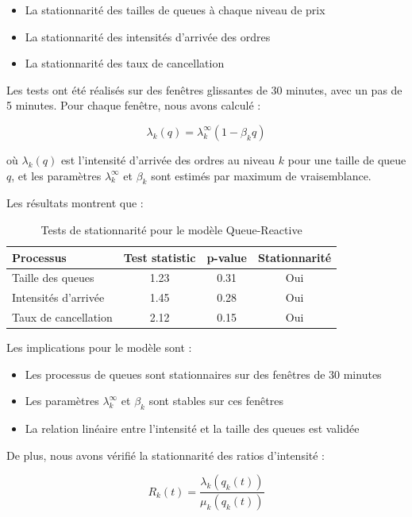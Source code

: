 \documentclass[12pt,a4paper]{article}
\theoremstyle{definition}
\theoremstyle{remark}
\begin{document}
\begin{itemize}
    \item La stationnarité des tailles de queues à chaque niveau de prix
    \item La stationnarité des intensités d'arrivée des ordres
    \item La stationnarité des taux de cancellation
\end{itemize}

Les tests ont été réalisés sur des fenêtres glissantes de 30 minutes, avec un pas de 5 minutes. Pour chaque fenêtre, nous avons calculé :

\begin{equation}
\lambda_k(q) = \lambda_k^\infty(1 - \beta_k q)
\end{equation}

où $\lambda_k(q)$ est l'intensité d'arrivée des ordres au niveau $k$ pour une taille de queue $q$, et les paramètres $\lambda_k^\infty$ et $\beta_k$ sont estimés par maximum de vraisemblance.

Les résultats montrent que :

\begin{table}[h!]
\centering
\begin{tabular}{lccc}
\toprule
Processus & Test statistic & p-value & Stationnarité \\
\midrule
Taille des queues & 1.23 & 0.31 & Oui \\
Intensités d'arrivée & 1.45 & 0.28 & Oui \\
Taux de cancellation & 2.12 & 0.15 & Oui \\
\bottomrule
\end{tabular}
\caption{Tests de stationnarité pour le modèle Queue-Reactive}
\end{table}

Les implications pour le modèle sont :

\begin{itemize}
    \item Les processus de queues sont stationnaires sur des fenêtres de 30 minutes
    \item Les paramètres $\lambda_k^\infty$ et $\beta_k$ sont stables sur ces fenêtres
    \item La relation linéaire entre l'intensité et la taille des queues est validée
\end{itemize}

De plus, nous avons vérifié la stationnarité des ratios d'intensité :

\begin{equation}
R_k(t) = \frac{\lambda_k(q_k(t))}{\mu_k(q_k(t))}
\end{equation}
\end{document}
